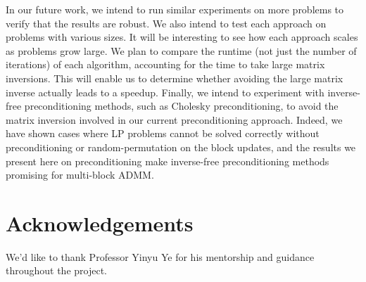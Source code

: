 \documentclass{article}
\begin{document}
{In our future work, we intend to run similar experiments on more problems to verify that the results are robust. We also intend to test each approach on problems with various sizes. It will be interesting to see how each approach scales as problems grow large. We plan to compare the runtime (not just the number of iterations) of each algorithm, accounting for the time to take large matrix inversions. This will enable us to determine whether avoiding the large matrix inverse actually leads to a speedup. Finally, we intend to experiment with inverse-free preconditioning methods, such as Cholesky preconditioning, to avoid the matrix inversion involved in our current preconditioning approach. Indeed, we have shown cases where LP problems cannot be solved correctly without preconditioning or random-permutation on the block updates, and the results we present here on preconditioning make inverse-free preconditioning methods promising for multi-block ADMM.

\vspace{0.2in}
\section{Acknowledgements}

We'd like to thank Professor Yinyu Ye for his mentorship and guidance throughout the project. 

}
\end{document}
